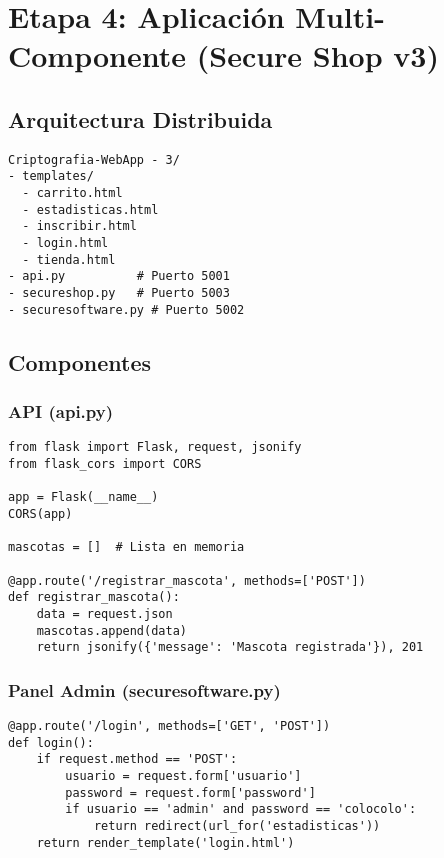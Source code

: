 \section{Etapa 4: Aplicación Multi-Componente (Secure Shop v3)}

\subsection{Arquitectura Distribuida}
\begin{lstlisting}
Criptografia-WebApp - 3/
- templates/
  - carrito.html
  - estadisticas.html
  - inscribir.html
  - login.html
  - tienda.html
- api.py          # Puerto 5001
- secureshop.py   # Puerto 5003
- securesoftware.py # Puerto 5002
\end{lstlisting}

\subsection{Componentes}
\subsubsection{API (api.py)}
\begin{verbatim}
from flask import Flask, request, jsonify
from flask_cors import CORS

app = Flask(__name__)
CORS(app)

mascotas = []  # Lista en memoria

@app.route('/registrar_mascota', methods=['POST'])
def registrar_mascota():
    data = request.json
    mascotas.append(data)
    return jsonify({'message': 'Mascota registrada'}), 201
\end{verbatim}

\subsubsection{Panel Admin (securesoftware.py)}
\begin{verbatim}
@app.route('/login', methods=['GET', 'POST'])
def login():
    if request.method == 'POST':
        usuario = request.form['usuario']
        password = request.form['password']
        if usuario == 'admin' and password == 'colocolo':
            return redirect(url_for('estadisticas'))
    return render_template('login.html')
\end{verbatim}

